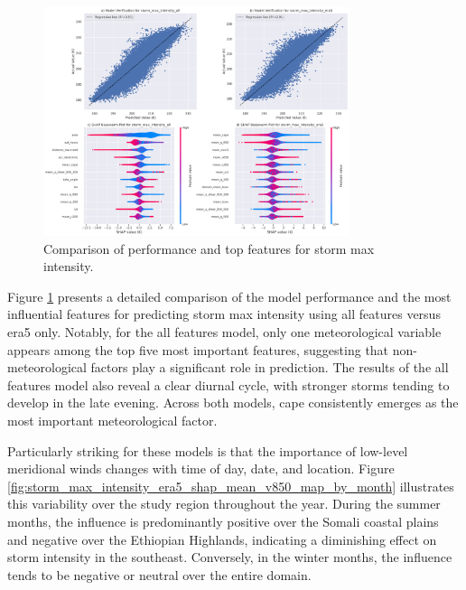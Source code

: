 \begin{figure}[ht]
    \centering
    \includegraphics[width=0.8\textwidth]{../figures/generated/experiments/storm_max_intensity/storm_max_intensity_summary.png}
    \caption{Comparison of performance and top features for storm max intensity.}
    \label{fig:storm_max_intensity_summary}
\end{figure}

Figure \ref{fig:storm_max_intensity_summary} presents a detailed comparison of the model performance and the most influential features for predicting storm max intensity using all features versus \acrshort{era5} only. Notably, for the all features model, only one meteorological variable appears among the top five most important features, suggesting that non-meteorological factors play a significant role in prediction. The results of the all features model also reveal a clear diurnal cycle, with stronger storms tending to develop in the late evening. Across both models, \acrshort{cape} consistently emerges as the most important meteorological factor.

Particularly striking for these models is that the importance of low-level meridional winds changes with time of day, date, and location. Figure \ref{fig:storm_max_intensity_era5_shap_mean_v850_map_by_month} illustrates this variability over the study region throughout the year. During the summer months, the influence is predominantly positive over the Somali coastal plains and negative over the Ethiopian Highlands, indicating a diminishing effect on storm intensity in the southeast. Conversely, in the winter months, the influence tends to be negative or neutral over the entire domain.

